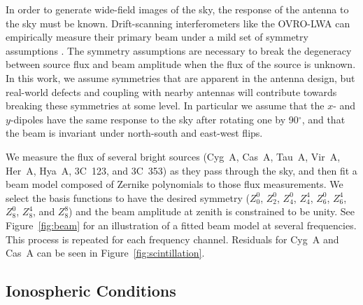 \documentclass[twocolumn]{aastex61}
\begin{document}
In order to generate wide-field images of the sky, the response of the antenna to the sky must be
known. Drift-scanning interferometers like the OVRO-LWA can empirically measure their primary beam
under a mild set of symmetry assumptions \citep{2012AJ....143...53P}. The symmetry assumptions are
necessary to break the degeneracy between source flux and beam amplitude when the flux of the source
is unknown. In this work, we assume symmetries that are apparent in the antenna design, but
real-world defects and coupling with nearby antennas will contribute towards breaking these
symmetries at some level. In particular we assume that the $x$- and $y$-dipoles have the same
response to the sky after rotating one by 90$^\circ$, and that the beam is invariant under
north-south and east-west flips.

We measure the flux of several bright sources (Cyg~A, Cas~A, Tau~A, Vir~A, Her~A, Hya~A, 3C~123, and
3C~353) as they pass through the sky, and then fit a beam model composed of Zernike polynomials to
those flux measurements. We select the basis functions to have the desired symmetry ($Z_0^0$,
$Z_2^0$, $Z_4^0$, $Z_4^4$, $Z_6^0$, $Z_6^4$, $Z_8^0$, $Z_8^4$, and $Z_8^8$) and the beam amplitude
at zenith is constrained to be unity. See Figure~\ref{fig:beam} for an illustration of a fitted beam
model at several frequencies. This process is repeated for each frequency channel. Residuals for
Cyg~A and Cas~A can be seen in Figure~\ref{fig:scintillation}.

\subsection{Ionospheric Conditions}\label{sec:ionosphere-conditions}
\end{document}
